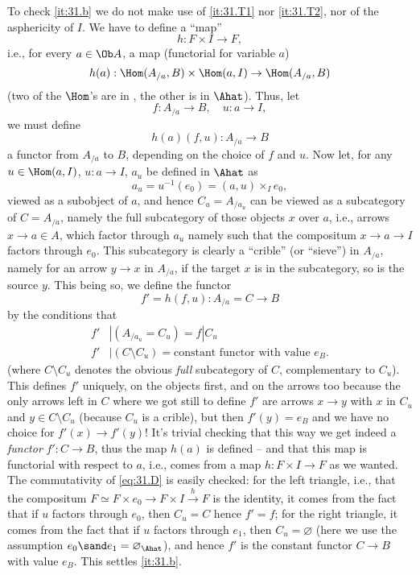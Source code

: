 To check \ref{it:31.b} we do not make use of \ref{it:31.T1} nor
\ref{it:31.T2}, nor of the asphericity of $I$. We have to define a
``map''
\[ h : F \times I \to F, \]
i.e., for every $a \in \Ob A$, a map (functorial for variable $a$)
\[ h(a) : \Hom(A_{/a},B) \times \Hom(a,I) \to \Hom(A_{/a},B)\]
(two of the $\Hom$'s are in \Cat, the other is in $\Ahat$). Thus,
let
\[ f:A_{/a}\to B, \quad u: a\to I,\]
we must define
\[ h(a)(f,u) : A_{/a} \to B \]
a functor from $A_{/a}$ to $B$, depending on the choice of $f$ and
$u$. Now let, for any $u\in\Hom(a,I)$, $u:a\to I$, $a_u$ be defined in
$\Ahat$ as
\[a_u = u^{-1}(e_0) = (a,u)\times_I e_0,\]
viewed as a subobject of $a$, and hence $C_u=A_{/a_u}$ can be viewed as a
subcategory of $C=A_{/a}$, namely the full subcategory of those objects
$x$ over $a$, i.e., arrows $x\to a\in A$, which factor through $a_u$
namely such that the compositum $x\to a\to I$ factors through
$e_0$. This subcategory is clearly a ``crible'' (or ``sieve'') in
$A_{/a}$, namely for an arrow $y\to x$ in $A_{/a}$, if the target $x$
is in the subcategory, so is the source $y$. This being so, we define
the functor
\[ f' = h(f,u) : A_{/a}=C \to B\]
by the conditions that
\begin{align*}
  f' &| (A_{/a_u} = C_u) = f | C_u\\
  f' &| (C \setminus C_u) = \text{constant functor with value $e_B$.}
\end{align*}
(where $C\setminus C_u$ denotes the obvious \emph{full} subcategory of
$C$, complementary to $C_u$). This defines $f'$ uniquely, on the
objects first, and on the arrows too because the only arrows left in
$C$ where we got still to define $f'$ are arrows $x\to y$ with $x$ in
$C_u$ and $y\in C\setminus C_u$ (because $C_u$ is a crible), but then
$f'(y)=e_B$ and we have no choice for $f'(x)\to f'(y)$! It's trivial
checking that this way we get indeed a \emph{functor} $f':C \to B$,
thus the map $h(a)$ is defined -- and that this map is functorial with
respect to $a$, i.e., comes from a map $h : F\times I \to F$ as we
wanted. The commutativity of \eqref{eq:31.D} is easily checked: for
the left triangle, i.e., that the compositum $F\simeq F\times e_0 \to
F\times I \xrightarrow h F$ is the identity, it comes from the fact
that if $u$ factors through $e_0$, then $C_u=C$ hence $f'=f$; for the
right triangle, it comes from the fact that if $u$ factors through
$e_1$, then $C_u=\varnothing$ (here we use the assumption $e_0 \sand e_1
= \varnothing_{\Ahat}$), and hence $f'$ is the constant functor $C
\to B$ with value $e_B$. This settles \ref{it:31.b}.

